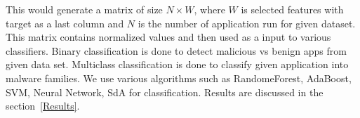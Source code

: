 This would generate a matrix of size \(N \times W\), where \(W\) is selected features with target as a last column and \(N\) is the number of application run for given dataset. This matrix contains normalized values and then used as a input to various classifiers. Binary classification is done to detect malicious vs benign apps from given data set. Multiclass classification is done to classify given application into malware families. We use various algorithms such as RandomeForest, AdaBoost, SVM, Neural Network, SdA for classification. Results are discussed in the section~\ref{Results}.
